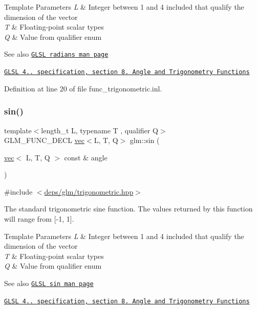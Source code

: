 \begin{DoxyTemplParams}{Template Parameters}
{\em L} & Integer between 1 and 4 included that qualify the dimension of the vector \\
\hline
{\em T} & Floating-\/point scalar types \\
\hline
{\em Q} & Value from qualifier enum\\
\hline
\end{DoxyTemplParams}
\begin{DoxySeeAlso}{See also}
\href{http://www.opengl.org/sdk/docs/manglsl/xhtml/radians.xml}{\tt G\+L\+SL radians man page} 

\href{http://www.opengl.org/registry/doc/GLSLangSpec.4.20.8.pdf}{\tt G\+L\+SL 4.. specification, section 8. Angle and Trigonometry Functions} 
\end{DoxySeeAlso}


Definition at line 20 of file func\+\_\+trigonometric.\+inl.

\mbox{\label{group__core__func__trigonometric_ga29747fd108cb7292ae5a284f69691a69}} 
\subsubsection{\texorpdfstring{sin()}{sin()}}
{\footnotesize\ttfamily template$<$length\+\_\+t L, typename T , qualifier Q$>$ \\
G\+L\+M\+\_\+\+F\+U\+N\+C\+\_\+\+D\+E\+CL \hyperlink{structglm_1_1vec}{vec}$<$L, T, Q$>$ glm\+::sin (\begin{DoxyParamCaption}\item[{\hyperlink{structglm_1_1vec}{vec}$<$ L, T, Q $>$ const \&}]{angle }\end{DoxyParamCaption})}



{\ttfamily \#include $<$\hyperlink{trigonometric_8hpp}{deps/glm/trigonometric.\+hpp}$>$}

The standard trigonometric sine function. The values returned by this function will range from \mbox{[}-\/1, 1\mbox{]}.


\begin{DoxyTemplParams}{Template Parameters}
{\em L} & Integer between 1 and 4 included that qualify the dimension of the vector \\
\hline
{\em T} & Floating-\/point scalar types \\
\hline
{\em Q} & Value from qualifier enum\\
\hline
\end{DoxyTemplParams}
\begin{DoxySeeAlso}{See also}
\href{http://www.opengl.org/sdk/docs/manglsl/xhtml/sin.xml}{\tt G\+L\+SL sin man page} 

\href{http://www.opengl.org/registry/doc/GLSLangSpec.4.20.8.pdf}{\tt G\+L\+SL 4.. specification, section 8. Angle and Trigonometry Functions} 
\end{DoxySeeAlso}


